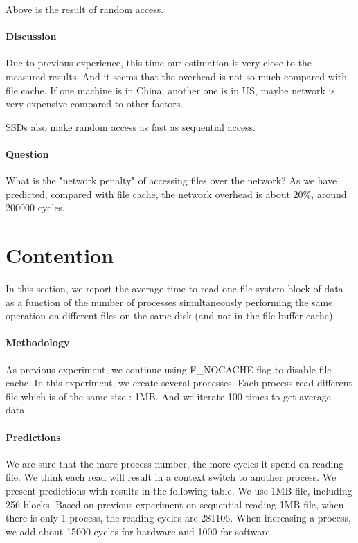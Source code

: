 Above is the result of random access.

\paragraph{Discussion}
Due to previous experience, this time our estimation is very close to the measured results. And it seems that the overhead is not so much compared with file cache. If one machine is in China, another one is in US, maybe network is very expensive compared to other factors.

SSDs also make random access as fast as sequential access.

\paragraph{Question} What is the "network penalty" of accessing files over the network?  As we have predicted, compared with file cache, the network overhead is about 20\%, around 200000 cycles.

\section{Contention}
In this section, we report the average time to read one file system block of data as a function of the number of processes simultaneously performing the same operation on different files on the same disk (and not in the file buffer cache).

\paragraph{Methodology}
As previous experiment, we continue using F\_NOCACHE flag to disable file cache. In this experiment, we create several processes. Each process read different file which is of the same size : 1MB. And we iterate 100 times to get average data. 

\paragraph{Predictions}
We are sure that the more process number, the more cycles it spend on reading file. We think each read will result in a context switch to another process. We present predictions with results in the following table. We use 1MB file, including 256 blocks. Based on previous experiment on sequential reading 1MB file, when there is only 1 process, the reading cycles are 281106. When increasing a process, we add about 15000 cycles for hardware and 1000 for software.

